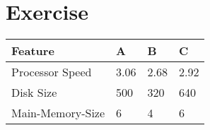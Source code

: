 \section{Exercise}
    
\begin{table}[!htb]
    \centering
    \begin{tabular}{llll}
    \hline
    \textbf{Feature} & \textbf{A} & \textbf{B} & \textbf{C} \\ \hline
    Processor Speed  & 3.06       & 2.68       & 2.92       \\
    Disk Size        & 500        & 320        & 640        \\
    Main-Memory-Size & 6          & 4          & 6          \\ \hline
    \end{tabular}
\end{table}

